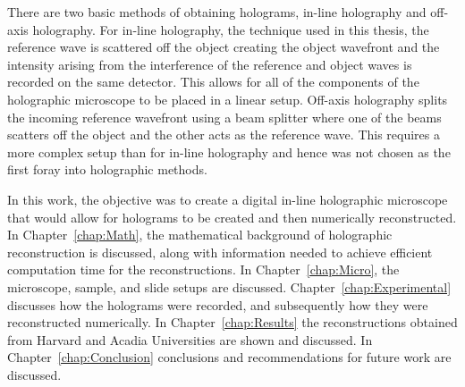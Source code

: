 There are two basic methods of obtaining holograms, in-line holography and
off-axis holography. 
For in-line holography, the technique used in this thesis, the
reference wave is scattered off the object creating the object wavefront
and the intensity arising from the interference of the reference and object
waves is recorded on the same detector.
This allows for all of the components of the holographic
microscope to be placed in a linear setup. Off-axis holography splits the
incoming reference wavefront using a beam splitter 
where one of the beams scatters
off the object and the other acts as the reference wave.
This requires a more complex setup than for in-line holography
and hence was not chosen as the first foray into holographic methods.

In this work, the objective was to create a digital in-line holographic
microscope that would allow for holograms to be created and then numerically
reconstructed. In Chapter~\ref{chap:Math}, the mathematical background of
holographic reconstruction is discussed, along with information
needed to achieve efficient computation time for the reconstructions. In
Chapter~\ref{chap:Micro}, the microscope,
sample, and slide
setups are discussed. Chapter~\ref{chap:Experimental} discusses how the
holograms were recorded, 
and subsequently how they were
reconstructed numerically. In Chapter~\ref{chap:Results} the reconstructions
obtained from Harvard and Acadia Universities are shown and discussed. In
Chapter~\ref{chap:Conclusion} conclusions and recommendations for future work
are discussed.



